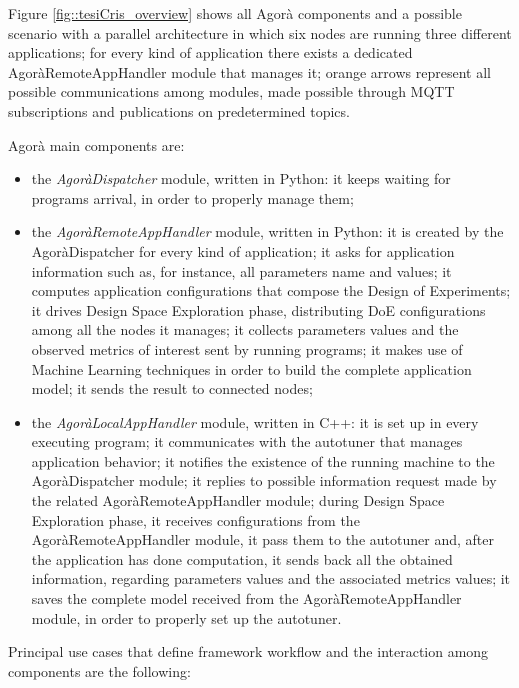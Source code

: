 Figure \ref{fig::tesiCris_overview} shows all Agorà components and a possible scenario with a parallel architecture in which six nodes are running three different applications; for every kind of application there exists a dedicated AgoràRemoteAppHandler module that manages it; orange arrows represent all possible communications among modules, made possible through MQTT subscriptions and publications on predetermined topics.

Agorà main components are:

\begin{itemize}

    \item the \textit{AgoràDispatcher} module, written in Python: it keeps waiting for programs arrival, in order to properly manage them;
    
    \item the \textit{AgoràRemoteAppHandler} module, written in Python: it is created by the AgoràDispatcher for every kind of application; it asks for application information such as, for instance, all parameters name and values; it computes application configurations that compose the Design of Experiments; it drives Design Space Exploration phase, distributing DoE configurations among all the nodes it manages; it collects parameters values and the observed metrics of interest sent by running programs; it makes use of Machine Learning techniques in order to build the complete application model; it sends the result to connected nodes;
    
    \item the \textit{AgoràLocalAppHandler} module, written in C++: it is set up in every executing program; it communicates with the autotuner that manages application behavior; it notifies the existence of the running machine to the AgoràDispatcher module; it replies to possible information request made by the related AgoràRemoteAppHandler module; during Design Space Exploration phase, it receives configurations from the AgoràRemoteAppHandler module, it pass them to the autotuner and, after the application has done computation, it sends back all the obtained information, regarding parameters values and the associated metrics values; it saves the complete model received from the AgoràRemoteAppHandler module, in order to properly set up the autotuner.

\end{itemize}

Principal use cases that define framework workflow and the interaction among components are the following:


